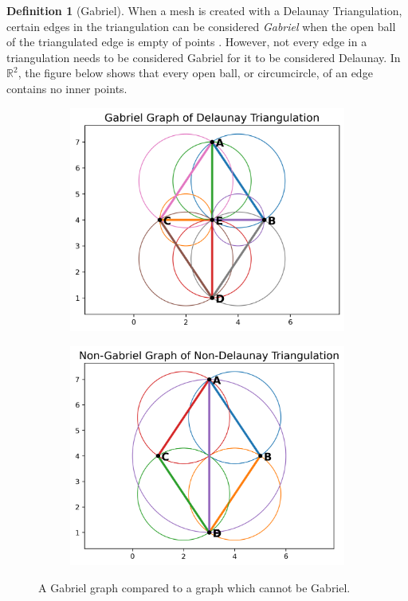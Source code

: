 \documentclass[ma]{uncgdissertationexp}
\theoremstyle{plain}
\theoremstyle{definition}
\newtheorem{definition}[theorem]{Definition}
\theoremstyle{remark}
\begin{document}
\begin{definition}[Gabriel]
When a mesh is created with a Delaunay Triangulation, certain edges in the triangulation can be considered \textit{Gabriel} when the open ball of the triangulated edge is empty of points \cite{gabriel}. However, not every edge in a triangulation needs to be considered Gabriel for it to be considered Delaunay. In $\mathbb{R}^{2}$, the figure below shows that every open ball, or circumcircle, of an edge contains no inner points.
\end{definition}
\begin{figure}[H]
    \centering
    \begin{subfigure}[b]{0.35\textwidth}
        \centering
        \includegraphics[width=\textwidth]{gabriel_circles.png}
    \end{subfigure}
        \begin{subfigure}[b]{0.35\textwidth}
        \centering
        \includegraphics[width=\textwidth]{non_gabriel_circles.png}
    \end{subfigure}
    \caption{A Gabriel graph compared to a graph which cannot be Gabriel.}
    \label{fig:good_bad_gabriel}
\end{figure}
\end{document}

